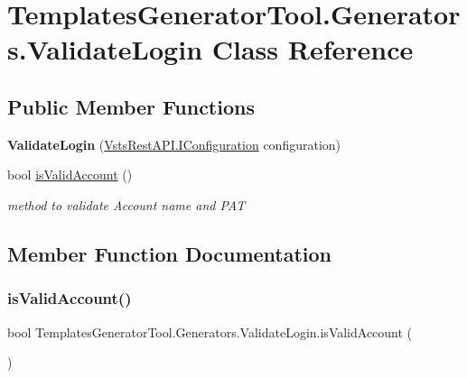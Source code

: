 \hypertarget{class_templates_generator_tool_1_1_generators_1_1_validate_login}{}\section{Templates\+Generator\+Tool.\+Generators.\+Validate\+Login Class Reference}
\label{class_templates_generator_tool_1_1_generators_1_1_validate_login}
\subsection*{Public Member Functions}
\begin{DoxyCompactItemize}
\item 
\mbox{\label{class_templates_generator_tool_1_1_generators_1_1_validate_login_aaff23f8fef218b8d0ddb84d9610cb754}} 
{\bfseries Validate\+Login} (\mbox{\hyperlink{interface_vsts_rest_a_p_i_1_1_i_configuration}{Vsts\+Rest\+A\+P\+I.\+I\+Configuration}} configuration)
\item 
bool \mbox{\hyperlink{class_templates_generator_tool_1_1_generators_1_1_validate_login_ab3bf9583c98282065b77f2a35ddeacd2}{is\+Valid\+Account}} ()
\begin{DoxyCompactList}\small\item\em method to validate Account name and P\+AT \end{DoxyCompactList}\end{DoxyCompactItemize}


\subsection{Member Function Documentation}
\mbox{\label{class_templates_generator_tool_1_1_generators_1_1_validate_login_ab3bf9583c98282065b77f2a35ddeacd2}} 
\subsubsection{\texorpdfstring{is\+Valid\+Account()}{isValidAccount()}}
{\footnotesize\ttfamily bool Templates\+Generator\+Tool.\+Generators.\+Validate\+Login.\+is\+Valid\+Account (\begin{DoxyParamCaption}{ }\end{DoxyParamCaption})}



